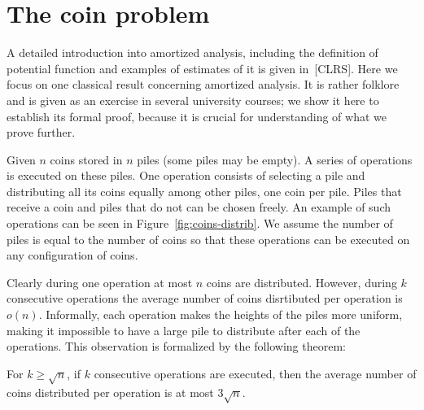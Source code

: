 \documentclass[a4paper,11pt]{article}
\begin{document}
\section{The coin problem}

A detailed introduction into amortized analysis, including
the definition of potential function and examples of estimates of it
is given in~[CLRS].
Here we focus on one classical result concerning amortized analysis.
It is rather folklore and is given as an exercise in several university courses;
we show it here to establish its formal proof, because it is crucial for
understanding of what we prove further.

Given $n$ coins stored in $n$ piles (some piles may be empty). A series of operations
is executed on these piles. One operation consists of selecting a pile and distributing
all its coins equally among other piles, one coin per pile. Piles that receive a coin
and piles that do not can be chosen freely. An example of such operations can be
seen in Figure~\ref{fig:coins-distrib}. We assume the number of piles is equal
to the number of coins so that these operations can be executed
on any configuration of coins.



Clearly during one operation at most $n$ coins are distributed. However, during $k$ consecutive operations the average number of coins disrtibuted per operation is $o(n)$. Informally, each operation makes the heights of the piles more uniform, making it impossible to have a large pile to distribute after each of the operations. This observation is formalized by the following theorem:

\begin{theorem} \label{thm:coins}
	For $k \ge \sqrt{n}$, if $k$ consecutive operations are executed, then the average number of coins distributed per operation is at most $3\sqrt{n}$.
\end{theorem}
\end{document}

